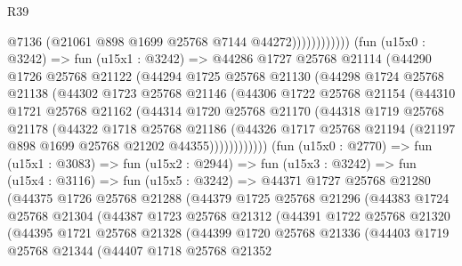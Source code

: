 \begin{lexlean}{R39}
\begin{coremodule}
                              @7136
                              (@21061 @898 @1699 @25768 @7144 @44272))))))))))))
        (fun (u15x0 : @3242) =>
        fun (u15x1 : @3242) =>
        @44286
          @1727
          @25768
          @21114
          (@44290
            @1726
            @25768
            @21122
            (@44294
              @1725
              @25768
              @21130
              (@44298
                @1724
                @25768
                @21138
                (@44302
                  @1723
                  @25768
                  @21146
                  (@44306
                    @1722
                    @25768
                    @21154
                    (@44310
                      @1721
                      @25768
                      @21162
                      (@44314
                        @1720
                        @25768
                        @21170
                        (@44318
                          @1719
                          @25768
                          @21178
                          (@44322
                            @1718
                            @25768
                            @21186
                            (@44326
                              @1717
                              @25768
                              @21194
                              (@21197 @898 @1699 @25768 @21202 @44355))))))))))))
        (fun (u15x0 : @2770) =>
        fun (u15x1 : @3083) =>
        fun (u15x2 : @2944) =>
        fun (u15x3 : @3242) =>
        fun (u15x4 : @3116) =>
        fun (u15x5 : @3242) =>
        @44371
          @1727
          @25768
          @21280
          (@44375
            @1726
            @25768
            @21288
            (@44379
              @1725
              @25768
              @21296
              (@44383
                @1724
                @25768
                @21304
                (@44387
                  @1723
                  @25768
                  @21312
                  (@44391
                    @1722
                    @25768
                    @21320
                    (@44395
                      @1721
                      @25768
                      @21328
                      (@44399
                        @1720
                        @25768
                        @21336
                        (@44403
                          @1719
                          @25768
                          @21344
                          (@44407
                            @1718
                            @25768
                            @21352

\end{coremodule}
\end{lexlean}
